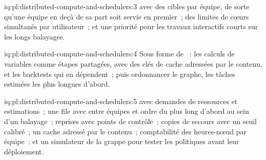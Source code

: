\begin{solution}{iq:pl:distributed-compute-and-schedulers:3}
 avec des cibles par équipe, de sorte qu'une équipe en deçà de sa part soit servie en premier~; des limites de cœurs simultanés par utilisateur~; et une priorité pour
les travaux interactifs courts sur les longs balayages.
\end{solution}

\begin{solution}{iq:pl:distributed-compute-and-schedulers:4}
Sous forme de ~: les calculs de variables comme étapes partagées, avec des clés de cache adressées par le contenu, et les backtests qui en dépendent~; puis ordonnancer
le graphe, les tâches estimées les plus longues d'abord.
\end{solution}

\begin{solution}{iq:pl:distributed-compute-and-schedulers:5}
 avec demandes de ressources et estimations~; une file avec  entre équipes et ordre du plus long d'abord au sein d'un balayage~; reprises
avec points de contrôle~; copies de secours avec un seuil calibré~; un cache adressé par le contenu~; comptabilité des heures-nœud par équipe~; et un simulateur de la
grappe pour tester les politiques avant leur déploiement.
\end{solution}
